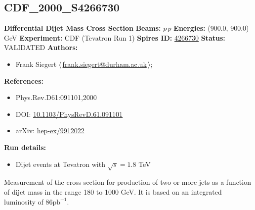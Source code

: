 \clearpage


\clearpage

\subsection[CDF\_2000\_S4266730]{CDF\_2000\_S4266730\,\cite{Affolder:1999ua}}
\textbf{Differential Dijet Mass Cross Section}\newline
\textbf{Beams:} $p$\,$\bar{p}$ \newline
\textbf{Energies:} (900.0, 900.0) GeV \newline
\textbf{Experiment:} CDF (Tevatron Run 1) \newline
\textbf{Spires ID:} \href{http://www.slac.stanford.edu/spires/find/hep/www?rawcmd=key+4266730}{4266730}\newline
\textbf{Status:} VALIDATED\newline
\textbf{Authors:}
\begin{itemize}
  \item Frank Siegert $\langle\,$\href{mailto:frank.siegert@durham.ac.uk}{frank.siegert@durham.ac.uk}$\,\rangle$;
\end{itemize}
\textbf{References:}
\begin{itemize}
  \item Phys.Rev.D61:091101,2000
  \item DOI: \href{http://dx.doi.org/10.1103/PhysRevD.61.091101}{10.1103/PhysRevD.61.091101}
  \item arXiv: \href{http://arxiv.org/abs/hep-ex/9912022}{hep-ex/9912022}
\end{itemize}
\textbf{Run details:}
\begin{itemize}

  \item Dijet events at Tevatron with $\sqrt{s}=1.8$ TeV\end{itemize}

\noindent Measurement of the cross section for production of two or more jets as a function of dijet mass in the range 180 to 1000 GeV. It is based on an integrated luminosity of $86 \mathrm{pb}^{-1}$.

\clearpage


\clearpage

